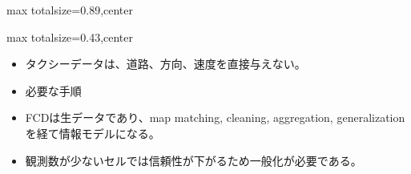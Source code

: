 \begin{minipage}[t]{0.58\textwidth}
\begin{adjustbox}{max totalsize={\textwidth}{0.89\textheight},center}
\begin{minipage}{\textwidth}
\end{minipage}
\end{adjustbox}
\end{minipage}


\clearpage
{}
\begin{minipage}[t]{0.405\textwidth}
\begin{adjustbox}{max totalsize={\textwidth}{0.43\textheight},center}
\begin{minipage}{\textwidth}\scriptsize
{}\begin{itemize}
\item タクシーデータは、道路、方向、速度を直接与えない。
\item 必要な手順
\end{itemize}\begin{itemize}
\item FCDは生データであり、map matching, cleaning, aggregation, generalization を経て情報モデルになる。
\item 観測数が少ないセルでは信頼性が下がるため一般化が必要である。
\end{itemize}
\end{minipage}
\end{adjustbox}
\end{minipage}\hfill
